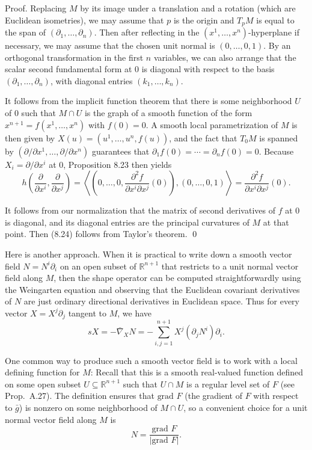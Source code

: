 Proof. Replacing $M$ by its image under a translation and a rotation (which are Euclidean isometries), we may assume that $p$ is the origin and $T_p M$ is equal to the span of $(\partial_1, \ldots, \partial_n)$. Then after reflecting in the $(x^1, \ldots, x^n)$-hyperplane if necessary, we may assume that the chosen unit normal is $(0, \ldots, 0, 1)$. By an orthogonal transformation in the first $n$ variables, we can also arrange that the scalar second fundamental form at $0$ is diagonal with respect to the basis $(\partial_1, \ldots, \partial_n)$, with diagonal entries $(k_1, \ldots, k_n)$.

It follows from the implicit function theorem that there is some neighborhood $U$ of $0$ such that $M \cap U$ is the graph of a smooth function of the form $x^{n+1} = f(x^1, \ldots, x^n)$ with $f(0) = 0$. A smooth local parametrization of $M$ is then given by $X(u) = (u^1, \ldots, u^n, f(u))$, and the fact that $T_0 M$ is spanned by $(\partial/\partial x^1, \ldots, \partial/\partial x^n)$ guarantees that $\partial_1 f(0) = \cdots = \partial_n f(0) = 0$. Because $X_i = \partial/\partial x^i$ at $0$, Proposition 8.23 then yields
\[
h\left(\frac{\partial}{\partial x^i}, \frac{\partial}{\partial x^j}\right) = \left\langle \left(0, \ldots, 0, \frac{\partial^2 f}{\partial x^i \partial x^j}(0)\right), (0, \ldots, 0, 1)\right\rangle = \frac{\partial^2 f}{\partial x^i \partial x^j}(0).
\]

It follows from our normalization that the matrix of second derivatives of $f$ at $0$ is diagonal, and its diagonal entries are the principal curvatures of $M$ at that point. Then (8.24) follows from Taylor's theorem. \qed

Here is another approach. When it is practical to write down a smooth vector field $N = N^i \partial_i$ on an open subset of $\mathbb{R}^{n+1}$ that restricts to a unit normal vector field along $M$, then the shape operator can be computed straightforwardly using the Weingarten equation and observing that the Euclidean covariant derivatives of $N$ are just ordinary directional derivatives in Euclidean space. Thus for every vector $X = X^j \partial_j$ tangent to $M$, we have
\begin{equation}
s X = -\bar{\nabla}_X N = -\sum_{i,j=1}^{n+1} X^j (\partial_j N^i) \partial_i.
\tag{8.25}
\end{equation}

One common way to produce such a smooth vector field is to work with a local defining function for $M$: Recall that this is a smooth real-valued function defined on some open subset $U \subseteq \mathbb{R}^{n+1}$ such that $U \cap M$ is a regular level set of $F$ (see Prop.\ A.27). The definition ensures that $\text{grad } F$ (the gradient of $F$ with respect to $\bar{g}$) is nonzero on some neighborhood of $M \cap U$, so a convenient choice for a unit normal vector field along $M$ is
\[
N = \frac{\text{grad } F}{|\text{grad } F|}.
\]

